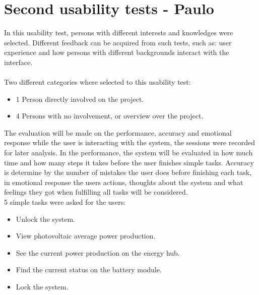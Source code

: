 \section{Second usability tests - Paulo}

In this usability test, persons with different interests and knowledges were selected. Different feedback can be acquired from such tests, such as: user experience and how persons with different backgrounds interact with the interface.
\\
\\Two different categories where selected to this usability test:
\begin{itemize}
	\item 1 Person directly involved on the project.
	\item 4 Persons with no involvement, or overview over the project.
\end{itemize}
The evaluation will be made on the performance, accuracy and emotional response while the user is interacting with the system, the sessions were recorded for later analysis.\p
In the performance, the system will be evaluated in how much time and how many steps it takes before the user finishes simple tasks. Accuracy is determine by the number of mistakes the user does before finishing each task, in emotional response the users actions, thoughts about the system and what feelings they got when fulfilling all tasks will be considered.\p
\\ 5 simple tasks were asked for the users:
\begin{itemize}
	\item Unlock the system.
	\item View photovoltaic average power production.
	\item See the current power production on the energy hub.
	\item Find the current status on the battery module.
	\item Lock the system.
\end{itemize}

